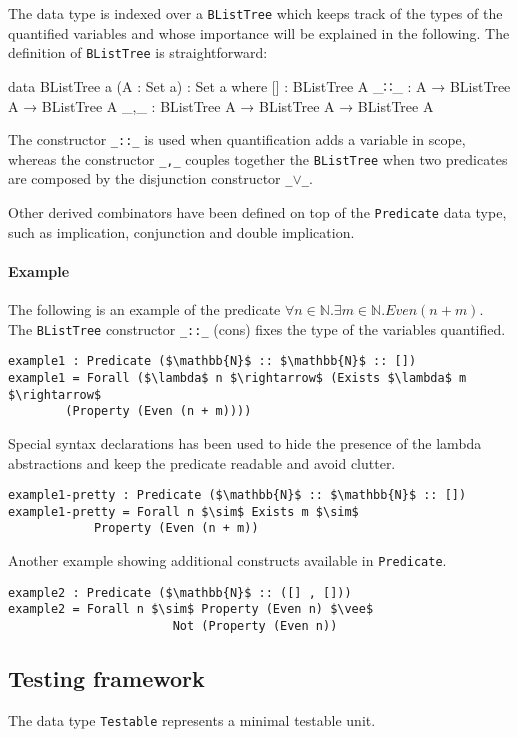 \documentclass[10pt,a4paper]{article}
\begin{document}
\begin{itemize}
The data type is indexed over a \texttt{BListTree} which keeps track of the types of the quantified variables and whose importance will be explained in the following.
The definition of \texttt{BListTree} is straightforward:
\begin{code}
data BListTree {a} (A : Set a) : Set a where 
  [] : BListTree A
  _∷_ : A → BListTree A → BListTree A
  _,_ : BListTree A → BListTree A → BListTree A
\end{code}
The constructor \texttt{\_::\_} is used when quantification adds a variable in scope, whereas the constructor \texttt{\_,\_} couples together the \texttt{BListTree} when two predicates are composed by the disjunction constructor \texttt{\_$\vee$\_}.

Other derived combinators have been defined on top of the \texttt{Predicate} 
data type, such as implication, conjunction and double implication.

\paragraph{Example}
The following is an example of the predicate $\forall n \in \mathbb{N} . \exists m \in \mathbb{N} . Even (n + m)$. The \texttt{BListTree} constructor \texttt{\_::\_} (cons) fixes the type of the variables quantified.  

\begin{lstlisting}
example1 : Predicate ($\mathbb{N}$ :: $\mathbb{N}$ :: [])
example1 = Forall ($\lambda$ n $\rightarrow$ (Exists $\lambda$ m $\rightarrow$
		(Property (Even (n + m))))
\end{lstlisting}
Special syntax declarations has been used to hide the presence of the lambda abstractions and keep the predicate readable and avoid clutter.
\begin{lstlisting}
example1-pretty : Predicate ($\mathbb{N}$ :: $\mathbb{N}$ :: [])
example1-pretty = Forall n $\sim$ Exists m $\sim$ 
			Property (Even (n + m))
\end{lstlisting}
Another example showing additional constructs available in \texttt{Predicate}.
\begin{lstlisting}
example2 : Predicate ($\mathbb{N}$ :: ([] , []))
example2 = Forall n $\sim$ Property (Even n) $\vee$ 
                       Not (Property (Even n))
\end{lstlisting}
\end{itemize}

\subsection{Testing framework}
\label{sec:testing}
The data type \texttt{Testable} represents a minimal testable unit.
\end{document}
